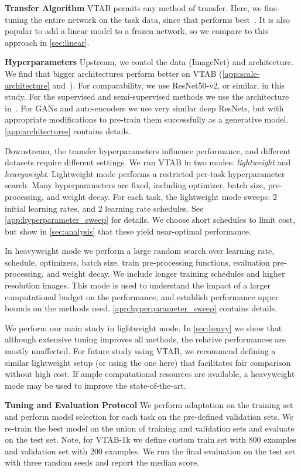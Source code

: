 \documentclass{article}
\newcommand{\myparagraph}[1]{\noindent\textbf{#1}\quad}
\newcommand{\imagenet}{ImageNet}
\begin{document}
\myparagraph{Transfer Algorithm}
VTAB permits any method of transfer.
Here, we fine-tuning the entire network on the task data, since that performs best~\citep{kornblith2018better}.
It is also popular to add a linear model to a frozen network, so we compare to this approach in \cref{sec:linear}.

\myparagraph{Hyperparameters}
Upstream, we contol the data (\imagenet{}) and architecture.
We find that bigger architectures perform better on VTAB (\cref{app:scale-architecture} and~\citet{kolesnikov2019revisiting}).
For comparability, we use ResNet50-v2, or similar, in this study.
For the supervised and semi-supervised methods we use the architecture in~\citet{he2016identity}.
For GANs and auto-encoders we use very similar deep ResNets, but with appropriate modifications to pre-train them successfully as a generative model.
\cref{app:architectures} contains details.

Downstream, the transfer hyperparameters influence performance, and different datasets require different settings.
We run VTAB in two modes: \emph{lightweight} and \emph{heavyweight}.
Lightweight mode performs a restricted per-task hyperparameter search.
Many hyperparameters are fixed, including optimizer, batch size, pre-processing, and weight decay.
For each task, the lightweight mode sweeps: 2 initial learning rates, and 2 learning rate schedules. See \cref{app:hyperparameter_sweep} for details.
We choose short schedules to limit cost, but show in \cref{sec:analysis} that these yield near-optimal performance.

In heavyweight mode we perform a large random search over learning rate, schedule, optimizers, batch size, train pre-processing functions, evaluation pre-processing, and weight decay.
We include longer training schedules and higher resolution images.
This mode is used to understand the impact of a larger computational budget on the performance, and establish performance upper bounds on the methods used.
\cref{app:hyperparameter_sweep} contains details.

We perform our main study in lightweight mode.
In \cref{sec:heavy} we show that although extensive tuning improves all methods, the relative performances are mostly unaffected.
For future study using VTAB, we recommend defining a similar lightweight setup (or using the one here) that facilitates fair comparison without high cost.
If ample computational resources are available, a heavyweight mode may be used to improve the state-of-the-art.

\myparagraph{Tuning and Evaluation Protocol}
We perform adaptation on the training set and perform model selection for each task on the pre-defined validation sets.
We re-train the best model on the union of training and validation sets and evaluate on the test set.
Note, for VTAB-1k we define custom train set with 800 examples and validation set with 200 examples.
We run the final evaluation on the test set with three random seeds and report the median score.
\end{document}
